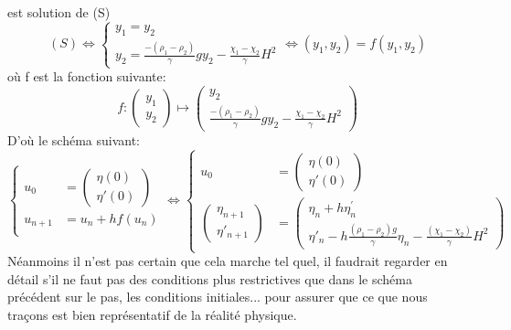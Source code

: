 \documentclass[10pt,a4paper]{article}
\begin{document}
est solution de (S)
\begin{equation}
(S) \Longleftrightarrow
\begin{cases}
y_1=y_2 \\
y_2=\frac{-(\rho_1-\rho_2)}{\gamma}gy_2-\frac{\chi_1-\chi_2}{\gamma}H^2
\end{cases}
\Longleftrightarrow
(y_1,y_2)=f(y_1,y_2)
\end{equation}
où f est la fonction suivante:
\begin{equation}
f: \begin{pmatrix}
y_1 \\
y_2
\end{pmatrix} \mapsto\begin{pmatrix}
	y_2 \\
	\frac{-(\rho_1-\rho_2)}{\gamma}gy_2-\frac{\chi_1-\chi_2}{\gamma}H^2
\end{pmatrix}
\end{equation}
D'où le schéma suivant:
\begin{equation}
\begin{cases}
u_{0} &=\begin{pmatrix}
   \eta(0)  \\
   \eta\prime(0)
\end{pmatrix} \\
u_{n+1} &= u_{n} + hf(u_{n})\\
\end{cases}
\Longleftrightarrow
\begin{cases}
u_{0} &=\begin{pmatrix}
   \eta(0)  \\
   \eta\prime(0)
\end{pmatrix} \\
\begin{pmatrix}
   \eta_{n+1}  \\
   \eta\prime_{n+1}
\end{pmatrix}  &= \begin{pmatrix}
   \eta_{n} +h \eta^{\prime}_{n}  \\
   \eta\prime_{n} - h \frac{(\rho_{1} - \rho_{2})g}{\gamma}\eta_{n}-\frac{(\chi_1-\chi_2)}{\gamma}H^2
\end{pmatrix}
\end{cases}
\end{equation}
Néanmoins il n'est pas certain que cela marche tel quel, il faudrait regarder en détail s'il ne faut pas des conditions plus restrictives que dans le schéma précédent sur le pas, les conditions initiales... pour assurer que ce que nous traçons est bien représentatif de la réalité physique.
\end{document}
